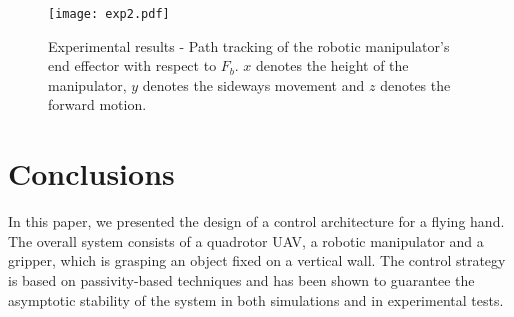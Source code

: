 \documentclass[a4paper, 10pt, conference]{ieeeconf}
\begin{document}
%
\begin{figure}[htp]
  \centering
   \texttt{[image: exp2.pdf]}
  \caption{Experimental results - Path tracking of the robotic manipulator's end effector with respect to $F_b$. $x$ denotes the height of the manipulator, $y$ denotes the sideways movement and $z$ denotes the forward motion.}
  \label{fig:real_ee}
\end{figure}



\section{Conclusions}
\label{sec:conclusions}
In this paper, we presented the design of a control architecture for a
flying hand. The overall system consists of a quadrotor UAV, a robotic manipulator and a gripper, which is grasping an
object fixed on a vertical wall. The control strategy is based on
passivity-based techniques and has been shown to guarantee the
asymptotic stability of the system in both simulations and in
experimental tests.





\end{document}
